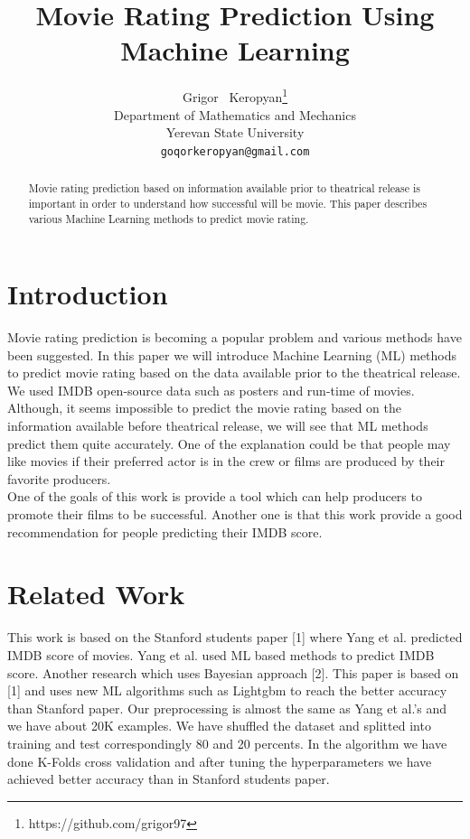 \documentclass{article}
\title{Movie Rating Prediction Using Machine Learning}
\author{%
  Grigor ~Keropyan\thanks{https://github.com/grigor97} \\
  Department of Mathematics and Mechanics\\
  Yerevan State University\\
  \texttt{goqorkeropyan@gmail.com} \\
}
\begin{document}
\maketitle

\begin{abstract}
  Movie rating prediction based on information available prior to theatrical release is important in order to understand how successful will be movie. This paper describes various Machine Learning methods to predict movie rating. 
\end{abstract}

\section{Introduction}

Movie rating prediction is becoming a popular problem and various methods have been suggested. In this paper we will introduce Machine Learning (ML) methods to predict movie rating based on the data available prior to the theatrical release. We used IMDB open-source data such as posters and run-time of movies. \\

Although, it seems impossible to predict the movie rating based on the information available before theatrical release, we will see that ML methods predict them quite accurately. One of the explanation could be that people may like movies if their preferred actor is in the crew or films are produced by their favorite producers.\\

One of the goals of this work is provide a tool which can help producers to promote their films to be successful. Another one is that this work provide a good recommendation for people predicting their IMDB score. 

\section{Related Work}
\label{rel_work}

This work is based on the Stanford students paper [1] where Yang et al. predicted IMDB score of movies. Yang et al. used ML based methods to predict IMDB score. Another research which uses Bayesian approach [2]. This paper is based on [1] and uses new ML algorithms such as Lightgbm to reach the better accuracy than Stanford paper. Our preprocessing is almost the same as Yang et al.'s and we have about 20K examples. We have shuffled the dataset and splitted into training and test correspondingly 80 and 20 percents. In the algorithm we have done K-Folds cross validation and after tuning the hyperparameters we have achieved better accuracy than in Stanford  students paper. 
\end{document}
